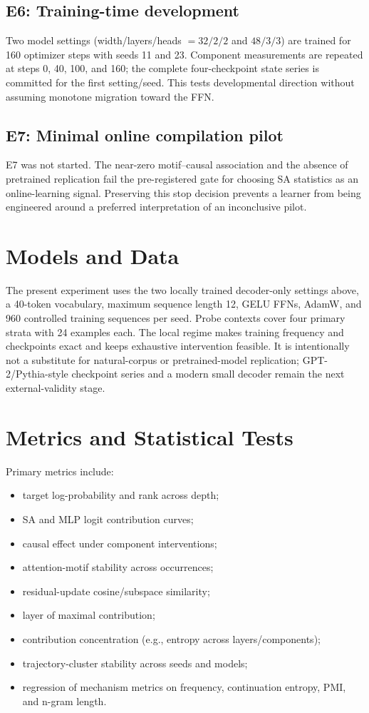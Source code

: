\documentclass[10pt]{article}
\begin{document}
\subsection{E6: Training-time development}
Two model settings (width/layers/heads $=32/2/2$ and $48/3/3$) are trained for 160 optimizer steps with seeds 11 and 23. Component measurements are repeated at steps 0, 40, 100, and 160; the complete four-checkpoint state series is committed for the first setting/seed. This tests developmental direction without assuming monotone migration toward the FFN.

\subsection{E7: Minimal online compilation pilot}
E7 was not started. The near-zero motif--causal association and the absence of pretrained replication fail the pre-registered gate for choosing SA statistics as an online-learning signal. Preserving this stop decision prevents a learner from being engineered around a preferred interpretation of an inconclusive pilot.

\section{Models and Data}
The present experiment uses the two locally trained decoder-only settings above, a 40-token vocabulary, maximum sequence length 12, GELU FFNs, AdamW, and 960 controlled training sequences per seed. Probe contexts cover four primary strata with 24 examples each. The local regime makes training frequency and checkpoints exact and keeps exhaustive intervention feasible. It is intentionally not a substitute for natural-corpus or pretrained-model replication; GPT-2/Pythia-style checkpoint series and a modern small decoder remain the next external-validity stage.

\section{Metrics and Statistical Tests}
Primary metrics include:
\begin{itemize}
    \item target log-probability and rank across depth;
    \item SA and MLP logit contribution curves;
    \item causal effect under component interventions;
    \item attention-motif stability across occurrences;
    \item residual-update cosine/subspace similarity;
    \item layer of maximal contribution;
    \item contribution concentration (e.g., entropy across layers/components);
    \item trajectory-cluster stability across seeds and models;
    \item regression of mechanism metrics on frequency, continuation entropy, PMI, and n-gram length.
\end{itemize}
\end{document}
